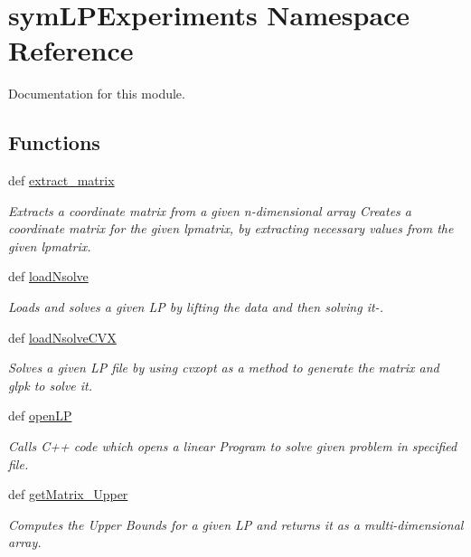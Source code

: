 \hypertarget{namespacesymLPExperiments}{\section{sym\-L\-P\-Experiments Namespace Reference}
\label{namespacesymLPExperiments}
}


Documentation for this module.  


\subsection*{Functions}
\begin{DoxyCompactItemize}
\item 
def \hyperlink{namespacesymLPExperiments_a00f49f67a2a2d9e675d6f392a28c6d21}{extract\-\_\-matrix}
\begin{DoxyCompactList}\small\item\em Extracts a coordinate matrix from a given n-\/dimensional array Creates a coordinate matrix for the given lpmatrix, by extracting necessary values from the given lpmatrix. \end{DoxyCompactList}\item 
def \hyperlink{namespacesymLPExperiments_a13db8437b54c2d6e412fdca6beebcd73}{load\-Nsolve}
\begin{DoxyCompactList}\small\item\em Loads and solves a given L\-P by lifting the data and then solving it-\/. \end{DoxyCompactList}\item 
def \hyperlink{namespacesymLPExperiments_aac02ec1af252db0b5351036a4725aa22}{load\-Nsolve\-C\-V\-X}
\begin{DoxyCompactList}\small\item\em Solves a given L\-P file by using cvxopt as a method to generate the matrix and glpk to solve it. \end{DoxyCompactList}\item 
def \hyperlink{namespacesymLPExperiments_afa34014b1f1672e7afeb43b92ef3a772}{open\-L\-P}
\begin{DoxyCompactList}\small\item\em Calls C++ code which opens a linear Program to solve given problem in specified file. \end{DoxyCompactList}\item 
def \hyperlink{namespacesymLPExperiments_a93c8ed89eba71dcb13d4b0096f20367f}{get\-Matrix\-\_\-\-Upper}
\begin{DoxyCompactList}\small\item\em Computes the Upper Bounds for a given L\-P and returns it as a multi-\/dimensional array. \end{DoxyCompactList}\item 

\end{DoxyCompactItemize}
